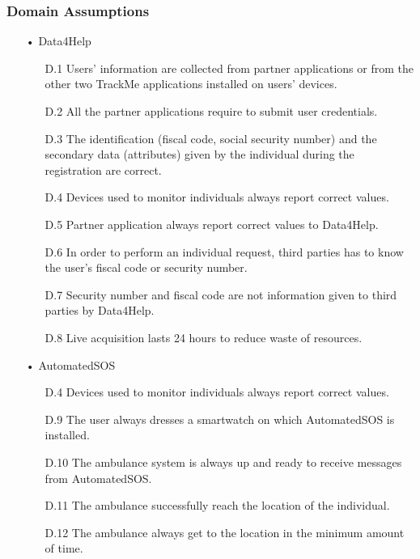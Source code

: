 \subsubsection{Domain Assumptions}
\begin{enumerate}

\item[•] {\Large Data4Help}
	\begin{enumerate}
	\item [D.1] Users' information are collected from partner applications or from the other two TrackMe applications installed on users' devices.
	\item [D.2] All the partner applications require to submit user credentials.
	\item [D.3] The identification (fiscal code, social security number) and the secondary data (attributes) given by the individual during the registration are correct.
    \item [D.4] Devices used to monitor individuals always report correct values.
    \item [D.5] Partner application always report correct values to Data4Help.
	\item [D.6] In order to perform an individual request, third parties has to know the user's fiscal code or security number.
	\item [D.7] Security number and fiscal code are not information given to third parties by Data4Help.
	\item [D.8] Live acquisition lasts 24 hours to reduce waste of resources.
	\end{enumerate}
	
\item[•] {\Large AutomatedSOS}
	\begin{enumerate}
	\item [D.4] Devices used to monitor individuals always report correct values.
	\item [D.9] The user always dresses a smartwatch on which AutomatedSOS is installed.    
	\item [D.10] The ambulance system is always up and ready to receive messages from AutomatedSOS.
    \item [D.11] The ambulance successfully reach the location of the individual.
    \item [D.12] The ambulance always get to the location in the minimum amount of time.
    
	\end{enumerate}
	

\end{enumerate}
